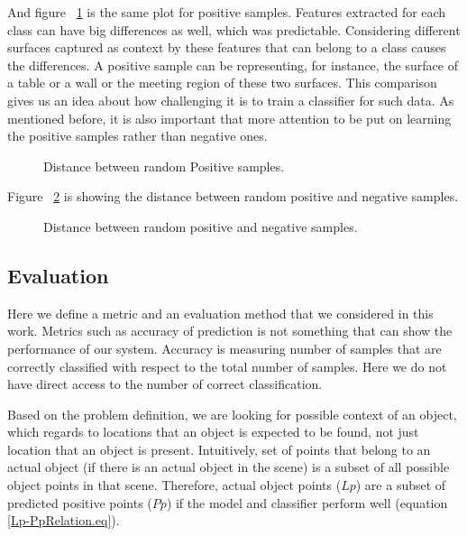 And figure ~\ref{DistanceOFTwoPosHist.figure} is the same plot for positive samples. 
Features extracted for each class can have big differences as well, which was predictable. 
Considering different surfaces captured as context by these features that can belong to a class causes the differences. 
A positive sample can be representing, for instance, the surface of a table or a wall or the meeting region of these two surfaces. 
This comparison gives us an idea about how challenging it is to train a classifier for such data.
As mentioned before, it is also important that more attention to be put on learning the positive samples rather than negative ones. 

\begin{figure}[t]
  \caption[Distance between random Positive samples]
  {Distance between random Positive samples.}
  \label{DistanceOFTwoPosHist.figure}
\end{figure}

Figure ~\ref{DistanceOFPosandNegHist.figure} is showing the distance between random positive and negative samples.

\begin{figure}[t]
  \caption[Distance of Positive and Negative samples]
  {Distance between random positive and negative samples.}
  \label{DistanceOFPosandNegHist.figure}
\end{figure}


\subsection{Evaluation}
\label{Evaluation.ssec}


Here we define a metric and an evaluation method that we considered in this work.
Metrics such as accuracy of prediction is not something that can show the performance of our system.
Accuracy is measuring number of samples that are correctly classified with respect to the total number of samples.
Here we do not have direct access to the number of correct classification. 

Based on the problem definition, we are looking for possible context of an object, which regards to locations that an object 
is expected to be found, not just location that an object is present.
Intuitively, set of points that belong to an actual object (if there is an actual object in the scene) is a subset of all possible 
object points in that scene.
Therefore, actual object points ($Lp$) are a subset of predicted positive points ($Pp$) if the model and classifier perform well 
(equation \ref{Lp-PpRelation.eq}).

